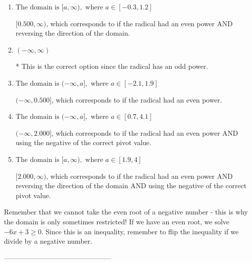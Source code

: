 \documentclass{extbook}[14pt]
\begin{document}
\begin{enumerate}[label=\Alph*.] 
\item $ \text{The domain is } [a, \infty), \text{   where } a \in [-0.3, 1.2] $ 

 $[0.500, \infty)$, which corresponds to if the radical had an even power AND reversing the direction of the domain. 
\item $ (-\infty, \infty) $ 

 * This is the correct option since the radical has an odd power. 
\item $ \text{The domain is } (-\infty, a], \text{   where } a \in [-2.1, 1.9] $ 

 $(-\infty, 0.500]$, which corresponds to if the radical had an even power. 
\item $ \text{The domain is } (-\infty, a], \text{   where } a \in [0.7, 4.1] $ 

 $(-\infty, 2.000]$, which corresponds to if the radical had an even power AND using the negative of the correct pivot value. 
\item $ \text{The domain is } [a, \infty), \text{   where } a \in [1.9, 4] $ 

 $[2.000, \infty)$, which corresponds to if the radical had an even power AND reversing the direction of the domain AND using the negative of the correct pivot value. 
\end{enumerate} 
 
Remember that we cannot take the even root of a negative number - this is why the domain is only sometimes restricted! If we have an even root, we solve $-6 x + 3 \geq 0$. Since this is an inequality, remember to flip the inequality if we divide by a negative number.

-----------------------------------------------
\end{document}
